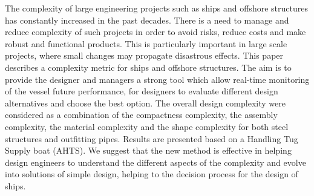 The complexity of large engineering projects such as ships and offshore structures has constantly increased in the past decades.
There is a need to manage and reduce complexity of such projects in order to avoid risks, reduce costs and make robust and functional products. This is particularly important in large scale projects, where small changes may propagate disastrous effects.
This paper describes  a complexity metric for ships and offshore structures. The aim is to provide the designer and managers a strong tool which allow real-time monitoring of the vessel future performance, for designers to evaluate different design alternatives and choose the best option.
The overall design complexity were considered as a combination of the compactness complexity, the assembly complexity, the material complexity and the shape complexity for both steel structures and outfitting pipes.
Results are presented based on a Handling Tug Supply boat (AHTS).
We suggest that the new method is effective in helping design engineers to understand the different aspects of the complexity and evolve into solutions of simple design, helping to the decision process for the design of ships.


